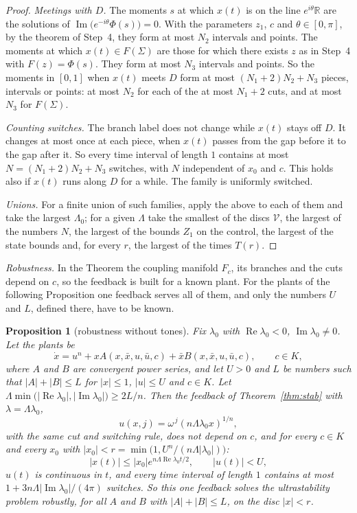 \documentclass[11pt,reqno]{amsart}
\theoremstyle{plain}
\newtheorem*{proposition}{Proposition}
\theoremstyle{definition}
\theoremstyle{remark}
\newcommand{\Sig}{\Sigma}
\begin{document}
\begin{proof}
\emph{Meetings with $D$.} The moments $s$ at which $x(t)$ is on the line $e^{i\theta}\mathbb R$ are the solutions of $\operatorname{Im}\bigl(e^{-i\theta}\Phi(s)\bigr)=0$. With the parameters $z_1$, $c$ and $\theta\in[0,\pi]$, by the theorem of Step~4, they form at most $N_2$ intervals and points. The moments at which $x(t)\in F(\Sig)$ are those for which there exists $z$ as in Step~4 with $F(z)=\Phi(s)$. They form at most $N_3$ intervals and points. So the moments in $[0,1]$ when $x(t)$ meets $D$ form at most $(N_1+2)N_2+N_3$ pieces, intervals or points: at most $N_2$ for each of the at most $N_1+2$ cuts, and at most $N_3$ for $F(\Sig)$.

\emph{Counting switches.} The branch label does not change while $x(t)$ stays off $D$. It changes at most once at each piece, when $x(t)$ passes from the gap before it to the gap after it. So every time interval of length $1$ contains at most $N=(N_1+2)N_2+N_3$ switches, with $N$ independent of $x_0$ and $c$. This holds also if $x(t)$ runs along $D$ for a while. The family is uniformly switched.

\emph{Unions.} For a finite union of such families, apply the above to each of them and take the largest $\Lambda_0$; for a given $\Lambda$ take the smallest of the discs $\mathcal V$, the largest of the numbers $N$, the largest of the bounds $Z_1$ on the control, the largest of the state bounds and, for every $r$, the largest of the times $T(r)$.
\end{proof}

\emph{Robustness.} In the Theorem the coupling manifold $F_c$, its branches and the cuts depend on $c$, so the feedback is built for a known plant. For the plants of the following Proposition one feedback serves all of them, and only the numbers $U$ and $L$, defined there, have to be known.

\begin{proposition}[robustness without tones]\label{prop:robust}
Fix $\lambda_0$ with $\operatorname{Re}\lambda_0<0$, $\operatorname{Im}\lambda_0\neq0$. Let the plants be
\[
  \dot x=u^{n}+xA(x,\bar x,u,\bar u,c)+\bar xB(x,\bar x,u,\bar u,c),\qquad c\in K,
\]
where $A$ and $B$ are convergent power series, and let $U>0$ and $L$ be numbers such that $|A|+|B|\le L$ for $|x|\le1$, $|u|\le U$ and $c\in K$. Let $\Lambda\min\bigl(|\operatorname{Re}\lambda_0|,|\operatorname{Im}\lambda_0|\bigr)\ge2L/n$. Then the feedback of Theorem~\ref{thm:stab} with $\lambda=\Lambda\lambda_0$,
\[
  u(x,j)=\omega^{\,j}(n\Lambda\lambda_0x)^{1/n},
\]
with the same cut and switching rule, does not depend on $c$, and for every $c\in K$ and every $x_0$ with $|x_0|<r=\min\bigl(1,U^{n}/(n\Lambda|\lambda_0|)\bigr)$:
\[
  |x(t)|\le|x_0|e^{n\Lambda\operatorname{Re}\lambda_0t/2},\qquad |u(t)|<U,
\]
$u(t)$ is continuous in $t$, and every time interval of length $1$ contains at most $1+3n\Lambda|\operatorname{Im}\lambda_0|/(4\pi)$ switches. So this one feedback solves the ultrastability problem robustly, for all $A$ and $B$ with $|A|+|B|\le L$, on the disc $|x|<r$.
\end{proposition}
\end{document}
